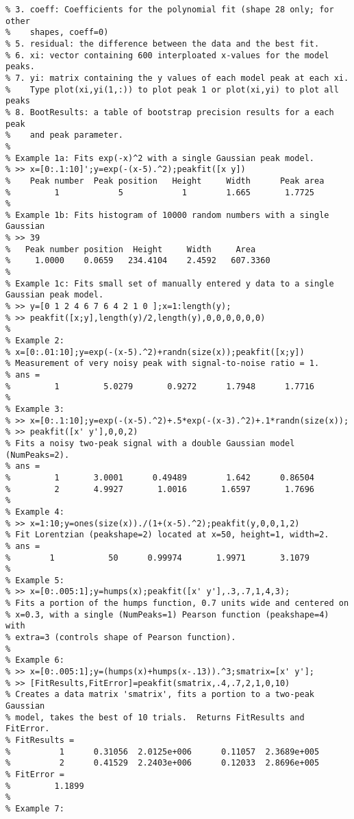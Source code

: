 \begin{lstlisting}
% 3. coeff: Coefficients for the polynomial fit (shape 28 only; for other 
%    shapes, coeff=0)
% 5. residual: the difference between the data and the best fit.
% 6. xi: vector containing 600 interploated x-values for the model peaks. 
% 7. yi: matrix containing the y values of each model peak at each xi. 
%    Type plot(xi,yi(1,:)) to plot peak 1 or plot(xi,yi) to plot all peaks
% 8. BootResults: a table of bootstrap precision results for a each peak
%    and peak parameter.
%  
% Example 1a: Fits exp(-x)^2 with a single Gaussian peak model.
% >> x=[0:.1:10]';y=exp(-(x-5).^2);peakfit([x y])
%    Peak number  Peak position   Height     Width      Peak area
%         1            5            1        1.665       1.7725
%
% Example 1b: Fits histogram of 10000 random numbers with a single Gaussian
% >> 39
%   Peak number position  Height     Width     Area
%     1.0000    0.0659   234.4104    2.4592   607.3360
%
% Example 1c: Fits small set of manually entered y data to a single Gaussian peak model.
% >> y=[0 1 2 4 6 7 6 4 2 1 0 ];x=1:length(y);
% >> peakfit([x;y],length(y)/2,length(y),0,0,0,0,0,0)
%
% Example 2:
% x=[0:.01:10];y=exp(-(x-5).^2)+randn(size(x));peakfit([x;y])
% Measurement of very noisy peak with signal-to-noise ratio = 1.
% ans =
%         1         5.0279       0.9272      1.7948      1.7716
%
% Example 3:
% >> x=[0:.1:10];y=exp(-(x-5).^2)+.5*exp(-(x-3).^2)+.1*randn(size(x));
% >> peakfit([x' y'],0,0,2)
% Fits a noisy two-peak signal with a double Gaussian model (NumPeaks=2).
% ans =
%         1       3.0001      0.49489        1.642      0.86504
%         2       4.9927       1.0016       1.6597       1.7696
%
% Example 4:
% >> x=1:10;y=ones(size(x))./(1+(x-5).^2);peakfit(y,0,0,1,2)
% Fit Lorentzian (peakshape=2) located at x=50, height=1, width=2.
% ans =
%        1           50      0.99974       1.9971       3.1079
%
% Example 5: 
% >> x=[0:.005:1];y=humps(x);peakfit([x' y'],.3,.7,1,4,3);
% Fits a portion of the humps function, 0.7 units wide and centered on 
% x=0.3, with a single (NumPeaks=1) Pearson function (peakshape=4) with
% extra=3 (controls shape of Pearson function).
%
% Example 6: 
% >> x=[0:.005:1];y=(humps(x)+humps(x-.13)).^3;smatrix=[x' y'];
% >> [FitResults,FitError]=peakfit(smatrix,.4,.7,2,1,0,10)
% Creates a data matrix 'smatrix', fits a portion to a two-peak Gaussian
% model, takes the best of 10 trials.  Returns FitResults and FitError.
% FitResults =
%          1      0.31056  2.0125e+006      0.11057  2.3689e+005
%          2      0.41529  2.2403e+006      0.12033  2.8696e+005
% FitError =
%         1.1899
%
% Example 7:

\end{lstlisting}

